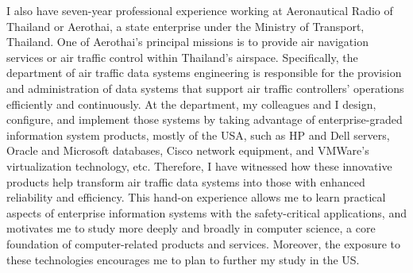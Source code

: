 \documentclass[10pt,a4paper,oneside]{report}
\begin{document}
\vspace{0.2cm}
I also have seven-year professional experience working at Aeronautical Radio of Thailand or Aerothai, a state enterprise under the Ministry of Transport, Thailand. One of Aerothai's principal missions is to provide air navigation services or air traffic control within Thailand's airspace. Specifically, the department of air traffic data systems engineering is responsible for the provision and administration of data systems that support air traffic controllers' operations efficiently and continuously. At the department, my colleagues and I design, configure, and implement those systems by taking advantage of enterprise-graded information system products, mostly of the USA, such as HP and Dell servers, Oracle and Microsoft databases, Cisco network equipment, and VMWare's virtualization technology, etc. Therefore, I have witnessed how these innovative products help transform air traffic data systems into those with enhanced reliability and efficiency. This hand-on experience allows me to learn practical aspects of enterprise information systems with the safety-critical applications, and motivates me to study more deeply and broadly in computer science, a core foundation of computer-related products and services. Moreover, the exposure to these technologies encourages me to plan to further my study in the US.
\end{document}
